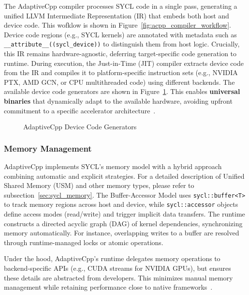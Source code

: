 The AdaptiveCpp compiler processes SYCL code in a single pass, generating a unified LLVM Intermediate 
Representation (IR) that embeds both host and device code. This wofklow is shown in Figure~\ref{fig:acpp_compiler_workflow}.
Device code regions (e.g., SYCL kernels) are annotated
with metadata such as \texttt{\_\_attribute\_\_((sycl\_device))} to distinguish them from host logic. Crucially,
this IR remains hardware-agnostic, deferring target-specific code generation to runtime. 
During execution, the Just-in-Time (JIT) compiler extracts device code from the IR and compiles it to platform-specific instruction 
sets (e.g., NVIDIA PTX, AMD GCN, or CPU multithreaded code) using different backends.
The available device code generators are shown in Figure~\ref{fig:acpp_runtime}.
This enables \textbf{universal binaries} that dynamically adapt to the available hardware, avoiding upfront commitment to a
specific accelerator architecture~\cite{SYCL2020}.

\begin{figure}[h]
    \centering
    
    \caption{AdaptiveCpp Device Code Generators~\cite{GitAdaptiveCpp}}
    \label{fig:acpp_runtime}
\end{figure}

\subsubsection*{Memory Management}

AdaptiveCpp implements SYCL’s memory model with a hybrid approach combining automatic and explicit strategies.
For a detailed description of Unified Shared Memory (USM) and other memory types, please refer to 
subsection~\ref{sec:sycl_memory}. The Buffer-Accessor Model uses \texttt{sycl::buffer<T>} to track memory 
regions across host and device, while \texttt{sycl::accessor} objects define access modes (read/write) and 
trigger implicit data transfers. The runtime constructs a directed acyclic graph (DAG) of kernel dependencies, 
synchronizing memory automatically. For instance, overlapping writes to a buffer are resolved through 
runtime-managed locks or atomic operations.

Under the hood, AdaptiveCpp’s runtime delegates memory operations to backend-specific APIs (e.g., CUDA streams 
for NVIDIA GPUs), but ensures these details are abstracted from developers. This minimizes manual memory 
management while retaining performance close to native frameworks~\cite{SYCL2020}.

